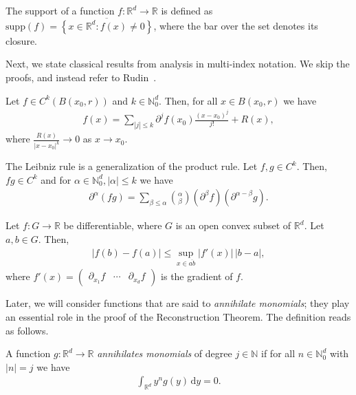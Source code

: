 The {support} of a function \(f: \mathbb{R}^d \to \mathbb{R}\) is defined as \(\mathrm{supp}(f) = \overline{\left \{ x \in \mathbb{R}^d : f(x) \neq 0 \right \}}\), where the bar over the set denotes its closure.

Next, we state classical results from analysis in multi-index notation. We skip the proofs, and instead refer to Rudin~\cite{MR0055409}.
\begin{theorem}
    Let \(f \in C^{k}(B(x_0, r))\) and \(k \in \mathbb{N}^d_0\). Then, for all \(x \in B(x_0, r)\) we have
    \begin{align*}
        f(x) = \sum\limits_{|j| \leq k}\partial^{j} f(x_0) \frac{{(x-x_0)}^j}{j!} + R(x),
    \end{align*}
    where \(\frac{R(x)}{|x-x_0|^{k}} \to 0\) as \(x \to x_0\).
\end{theorem}

\begin{theorem}\label{theorem:leibniz}
    The Leibniz rule is a generalization of the product rule. Let \( f, g \in {C}^k \). Then, \( fg \in {C}^k \) and for \( \alpha \in \mathbb{N}^d_0, |\alpha| \leq k \) we have
    \begin{align*}
        \partial^\alpha(fg) = \sum_{\beta \leq \alpha} \binom{\alpha}{\beta} (\partial^\beta f) (\partial^{\alpha - \beta} g).
    \end{align*}
\end{theorem}

\begin{theorem}\label{mean-value-inequality}
    Let \(f: G \to \mathbb{R}\) be differentiable, where \(G\) is an open convex subset of \(\mathbb{R}^d\). Let \(a,b \in G\). Then,
    \begin{align*}
        |f(b) - f(a)| \leq \sup\limits_{x \in \overline{ab}} |f'(x)| \, |b-a|,
    \end{align*}
    where 
    \(
        f'(x) = 
        \begin{pmatrix}
            \partial_{x_1}f & \cdots & \partial_{x_d}f
        \end{pmatrix}
    \)
    is the gradient of \(f\). 
\end{theorem}

Later, we will consider functions that are said to \emph{annihilate monomials}; they play an essential role in the proof of the Reconstruction Theorem. The definition reads as follows.

\begin{definition}
    A function \(g: \mathbb{R}^d \to \mathbb{R}\) \emph{annihilates monomials} of degree \(j \in \mathbb{N}\) if for all \(n \in \mathbb{N}^d_0\) with \(|n| = j\) we have
    \begin{align*}
        \int_{\mathbb{R}^d} y^n g (y) \, \mathrm{d}y = 0.
    \end{align*}
\end{definition}

